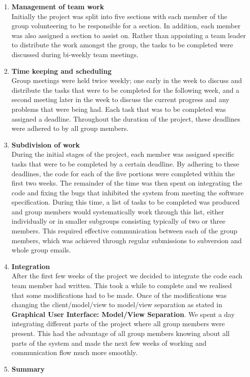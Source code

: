 \begin{enumerate}

	\item \textbf{Management of team work} \\
		Initially the project was split into five sections with each member of the group volunteering 
		to be responsible for a section. In addition, each member was also assigned a section to 
		assist on. Rather than appointing a team leader to distribute the work amongst the group, the 
		tasks to be completed were discussed during bi-weekly team meetings.
		
	\item \textbf{Time keeping and scheduling} \\
		Group meetings were held twice weekly; one early in the week to discuss and distribute the 
		tasks that were to be completed for the following week, and a second meeting later in the week
		to discuss the current progress and any problems that were being had. Each task that was to be
		completed was assigned a deadline. Throughout the duration of the project, these deadlines were
		adhered to by all group members.
	
	\item \textbf{Subdivision of work} \\
		During the initial stages of the project, each member was assigned specific tasks that were to be
		completed by a certain deadline. By adhering to these deadlines, the code for each of the five 
		portions were completed within the first two weeks. The remainder of the time was then spent on
		integrating the code and fixing the bugs that inhibited the system from meeting the software
		specification. During this time, a list of tasks to be completed was produced and group members 
		would systematically work through this list, either individually or in smaller subgroups consisting
		typically of two or three members. This required effective communication between each of the group
		members, which was achieved through regular submissions to subversion and whole group emails.
		
	\item \textbf{Integration} \\
		After the first few weeks of the project we decided to integrate the code each team member had
		written. This took a while to complete and we realised that some modifications had to be made.
		Once of the modifications was changing the client/model/view to model/view separation as stated 
		in \textbf{Graphical User Interface: Model/View Separation}. We spent a day integrating	different 
		parts of the project where all group members were present. This had the advantage of all group
		members knowing about all parts of the system and made the next few weeks of working and 
		communication flow much more smoothly.
		
	\item \textbf{Summary} \\
		 
 
\end{enumerate}
